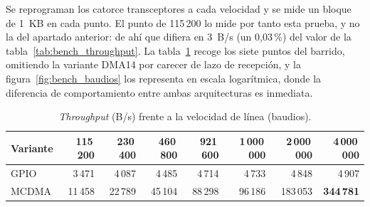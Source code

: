 Se reprograman los catorce transceptores a cada velocidad y se
mide un bloque de 1~KB en cada punto. El punto de 115\,200 lo mide por tanto esta prueba, y no la
del apartado anterior: de ahí que difiera en 3~B/s (un 0,03\,\%) del valor de la
tabla~\ref{tab:bench_throughput}. La tabla~\ref{tab:bench_baudios} recoge los siete puntos del
barrido, omitiendo la variante DMA14 por carecer de lazo de recepción, y la
figura~\ref{fig:bench_baudios} los representa en escala logarítmica, donde la diferencia de
comportamiento entre ambas arquitecturas es inmediata.

\begin{table}[H]
    \centering
    \small
    \begin{tabular}{lrrrrrrr}
        \hline
        \textbf{Variante} & \textbf{115\,200} & \textbf{230\,400} & \textbf{460\,800} & \textbf{921\,600} & \textbf{1\,000\,000} & \textbf{2\,000\,000} & \textbf{4\,000\,000} \\
        \hline
        GPIO  & 3\,471 & 4\,087 & 4\,485 & 4\,714 & 4\,733 & 4\,848 & 4\,907 \\
        MCDMA & 11\,458 & 22\,789 & 45\,104 & 88\,298 & 96\,186 & 183\,053 & \textbf{344\,781} \\
        \hline
    \end{tabular}
    \caption{\textit{Throughput} (B/s) frente a la velocidad de línea (baudios).}
    \label{tab:bench_baudios}
\end{table}

